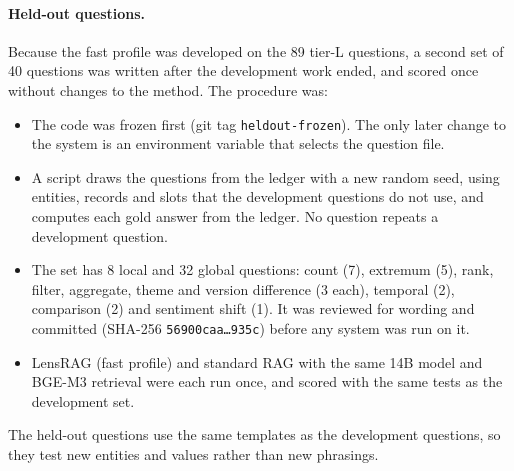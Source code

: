 \documentclass[11pt,letterpaper,oneside]{report}
\begin{document}
\paragraph{Held-out questions.}
Because the fast profile was developed on the 89 tier-L questions, a second
set of 40 questions was written after the development work ended, and scored
once without changes to the method. The procedure was:
\begin{itemize}
  \item The code was frozen first (git tag \texttt{heldout-frozen}). The only
  later change to the system is an environment variable that selects the
  question file.
  \item A script draws the questions from the ledger with a new random seed,
  using entities, records and slots that the development questions do not
  use, and computes each gold answer from the ledger. No question repeats a
  development question.
  \item The set has 8 local and 32 global questions: count (7), extremum (5),
  rank, filter, aggregate, theme and version difference (3 each), temporal
  (2), comparison (2) and sentiment shift (1). It was reviewed for wording
  and committed (SHA-256 \texttt{56900caa\ldots 935c}) before any system was
  run on it.
  \item LensRAG (fast profile) and standard RAG with the same 14B model and
  BGE-M3 retrieval were each run once, and scored with the same tests as the
  development set.
\end{itemize}
The held-out questions use the same templates as the development questions,
so they test new entities and values rather than new phrasings.
\end{document}
